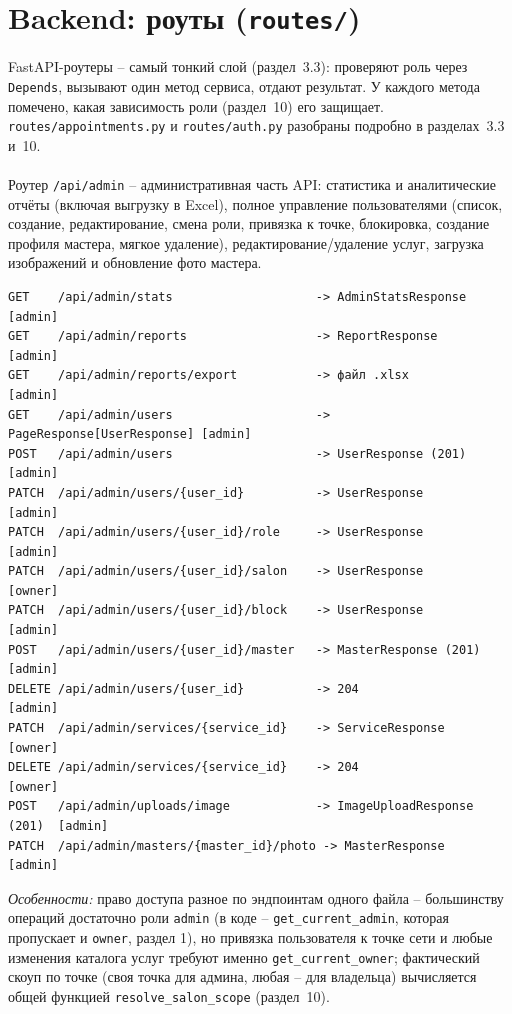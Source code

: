 \section{Backend: роуты (\texttt{routes/})}

FastAPI-роутеры -- самый тонкий слой (раздел~3.3): проверяют роль через
\texttt{Depends}, вызывают один метод сервиса, отдают результат. У
каждого метода помечено, какая зависимость роли (раздел~10) его
защищает. \texttt{routes/appointments.py} и \texttt{routes/auth.py}
разобраны подробно в разделах~3.3 и~10.

\paragraph{}
Роутер \texttt{/api/admin} -- административная часть API: статистика и
аналитические отчёты (включая выгрузку в Excel), полное управление
пользователями (список, создание, редактирование, смена роли, привязка к
точке, блокировка, создание профиля мастера, мягкое удаление),
редактирование/удаление услуг, загрузка изображений и обновление фото
мастера.
\begin{verbatim}
GET    /api/admin/stats                    -> AdminStatsResponse         [admin]
GET    /api/admin/reports                  -> ReportResponse             [admin]
GET    /api/admin/reports/export           -> файл .xlsx                 [admin]
GET    /api/admin/users                    -> PageResponse[UserResponse] [admin]
POST   /api/admin/users                    -> UserResponse (201)         [admin]
PATCH  /api/admin/users/{user_id}          -> UserResponse               [admin]
PATCH  /api/admin/users/{user_id}/role     -> UserResponse               [admin]
PATCH  /api/admin/users/{user_id}/salon    -> UserResponse               [owner]
PATCH  /api/admin/users/{user_id}/block    -> UserResponse               [admin]
POST   /api/admin/users/{user_id}/master   -> MasterResponse (201)       [admin]
DELETE /api/admin/users/{user_id}          -> 204                        [admin]
PATCH  /api/admin/services/{service_id}    -> ServiceResponse            [owner]
DELETE /api/admin/services/{service_id}    -> 204                        [owner]
POST   /api/admin/uploads/image            -> ImageUploadResponse (201)  [admin]
PATCH  /api/admin/masters/{master_id}/photo -> MasterResponse            [admin]
\end{verbatim}
\textit{Особенности:} право доступа разное по эндпоинтам одного файла --
большинству операций достаточно роли \texttt{admin} (в коде --
\texttt{get_current_admin}, которая пропускает и \texttt{owner}, раздел
1), но привязка пользователя к точке сети и любые изменения каталога
услуг требуют именно \texttt{get_current_owner}; фактический скоуп по
точке (своя точка для админа, любая -- для владельца) вычисляется общей
функцией \texttt{resolve_salon_scope} (раздел~10).

